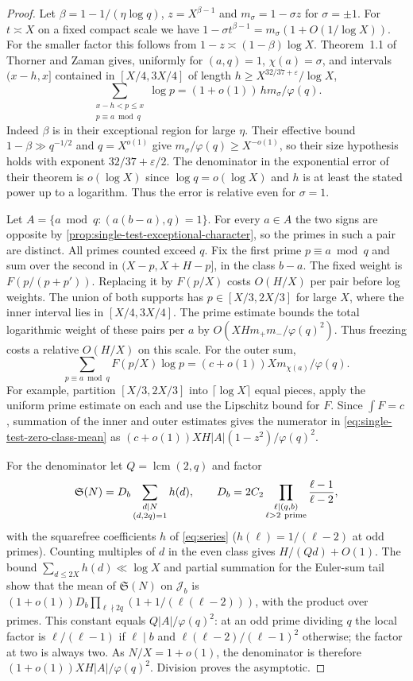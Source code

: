 \documentclass[11pt,a4paper]{article}
\numberwithin{equation}{section}
\newcommand{\SSS}{\mathfrak S}
\begin{document}
\begin{proof}
Let $\beta=1-1/(\eta\log q)$, $z=X^{\beta-1}$ and
$m_\sigma=1-\sigma z$ for $\sigma=\pm1$. For $t\asymp X$ on a
fixed compact scale we have
$1-\sigma t^{\beta-1}=m_\sigma(1+O(1/\log X))$.
For the smaller factor this follows from
$1-z\asymp(1-\beta)\log X$.
Theorem~1.1 of Thorner and Zaman \cite{ThornerZamanAP} gives,
uniformly for $(a,q)=1$, $\chi(a)=\sigma$, and intervals
$(x-h,x]$ contained in $[X/4,3X/4]$ of length
$h\ge X^{32/37+\varepsilon}/\log X$,
\[
 \sum_{\substack{x-h<p\le x\\p\equiv a\bmod q}}\log p
       =(1+o(1))\,h m_\sigma/\varphi(q).
\]
Indeed $\beta$ is in their exceptional region for large $\eta$.
Their effective bound $1-\beta\gg q^{-1/2}$ and $q=X^{o(1)}$
give $m_\sigma/\varphi(q)\ge X^{-o(1)}$, so their size
hypothesis holds with exponent $32/37+\varepsilon/2$.
The denominator in the exponential error of their theorem is
$o(\log X)$ since $\log q=o(\log X)$ and $h$ is at least the
stated power up to a logarithm. Thus the error is relative even
for $\sigma=1$.

Let $A=\{a\bmod q:(a(b-a),q)=1\}$. For every $a\in A$ the
two signs are opposite by \cref{prop:single-test-exceptional-character},
so the primes in such a pair are distinct. All primes counted
exceed $q$. Fix the first prime $p\equiv a\bmod q$ and sum over
the second in $(X-p,X+H-p]$, in the class $b-a$. The fixed
weight is $F(p/(p+p'))$. Replacing it by $F(p/X)$ costs
$O(H/X)$ per pair before log weights. The union of both supports
has $p\in[X/3,2X/3]$ for large $X$, where the inner interval lies
in $[X/4,3X/4]$. The prime estimate bounds the total logarithmic
weight of these pairs per $a$ by
$O(XH m_+m_-/\varphi(q)^2)$. Thus freezing costs a relative
$O(H/X)$ on this scale. For the outer sum,
\[
 \sum_{p\equiv a\bmod q} F(p/X)\log p
       =(c+o(1))X m_{\chi(a)}/\varphi(q).
\]
For example, partition $[X/3,2X/3]$ into $\lceil\log X\rceil$
equal pieces, apply the uniform prime estimate on each and use
the Lipschitz bound for $F$. Since $\int F=c$, summation of the
inner and outer estimates gives the numerator in
\eqref{eq:single-test-zero-class-mean} as
$(c+o(1))XH |A|(1-z^2)/\varphi(q)^2$.

For the denominator let $Q=\operatorname{lcm}(2,q)$ and factor
\[
 \SSS(N)=D_b\sum_{\substack{d\mid N\\(d,2q)=1}}h(d),
 \qquad
 D_b=2C_2\prod_{\substack{\ell\mid(q,b)\\\ell>2\ {\rm prime}}}
                  \frac{\ell-1}{\ell-2},
\]
with the squarefree coefficients $h$ of \eqref{eq:series}
($h(\ell)=1/(\ell-2)$ at odd primes).
Counting multiples of $d$ in the even class gives $H/(Qd)+O(1)$.
The bound $\sum_{d\le 2X}h(d)\ll\log X$ and partial summation
for the Euler-sum tail show that the mean of $\SSS(N)$ on
$\mathcal J_b$ is $(1+o(1))D_b\prod_{\ell\nmid 2q}
(1+1/(\ell(\ell-2)))$, with the product over primes.
This constant equals $Q|A|/\varphi(q)^2$: at an odd prime
dividing $q$ the local factor is $\ell/(\ell-1)$ if $\ell\mid b$
and $\ell(\ell-2)/(\ell-1)^2$ otherwise; the factor at two is
always two. As $N/X=1+o(1)$, the denominator is therefore
$(1+o(1))XH|A|/\varphi(q)^2$. Division proves the asymptotic.
\end{proof}
\end{document}
